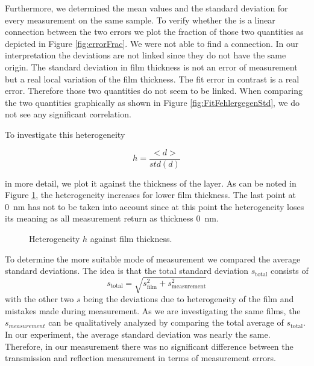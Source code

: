 Furthermore, we determined the mean values and the standard deviation for every measurement on the same sample. To verify whether the is a 
linear connection between the two errors we plot the fraction of those two quantities as depicted in Figure \ref{fig:errorFrac}. We were not able to find a connection.
In our interpretation the deviations are not linked since they do not have the same origin. The standard deviation in film thickness is 
not an error of measurement but a real local variation of the film thickness. The fit error in contrast is a real error. Therefore those two quantities do not seem to be linked. When
comparing the two quantities graphically as shown in Figure \ref{fig:FitFehlergegenStd}, we do not see any significant correlation.



To investigate this heterogeneity

\begin{equation}
    h = \frac{< d >}{std(d)}
\end{equation}

in more detail, we plot it against the thickness of the layer. As can be noted in Figure \ref{fig:thickheter}, the heterogeneity
increases for lower film thickness. The last point at \SI{0}{\nano\meter} has not to be taken into account since at this point the heterogeneity loses its meaning as all measurement 
return as thickness \SI{0}{\nano\meter}.

\begin{figure}[h]
    \centering
    
    \caption{Heterogeneity $h$ against film thickness.}
    \label{fig:thickheter}
\end{figure}

To determine the more suitable mode of measurement we compared the average standard deviations. The idea is that the total standard deviation $s_{\mathrm{total}}$ consists of
\begin{equation}
    s_{\mathrm{total}} = \sqrt{s_{\mathrm{film}}^2 + s_{\mathrm{measurement}}^2}
\end{equation}
with the other two $s$ being the deviations due to heterogeneity of the film and mistakes made during measurement. As we are investigating the same films, the $s_{measurement}$ can be qualitatively analyzed 
by comparing the total average of $s_{\mathrm{total}}$. In our experiment, the average standard deviation was nearly the same. Therefore, in our measurement there was no 
significant difference between the transmission and reflection measurement in terms of measurement errors.
%         
    

